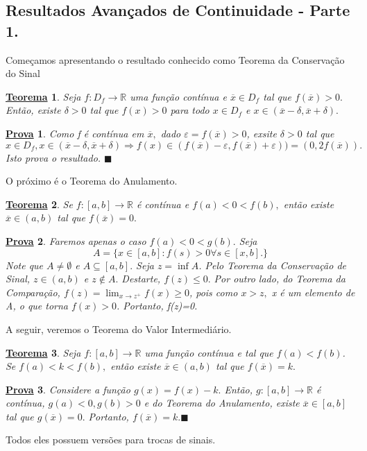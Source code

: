 \documentclass{article}
\newtheorem*{theorem*}{\underline{Teorema}}
\newtheorem*{proof*}{\underline{Prova}}
\renewcommand\qedsymbol{$\blacksquare$}
\begin{document}
\subsection{Resultados Avan\c cados de Continuidade - Parte 1.}
Come\c camos apresentando o resultado conhecido como Teorema da Conserva\c c\~ao do Sinal
 \begin{theorem*}
   Seja $f:D_{f}\rightarrow \mathbb{R}$ uma fun\c c\~ao cont\'inua e $\overline{x}\in D_{f}$ tal que $f(\overline{x})>0.$ 
   Ent\~ao, existe $\delta>0$ tal que $f(x)>0$ para todo $x\in D_{f}$ e $x\in(\overline{x}-\delta, \overline{x}+\delta).$
 \end{theorem*}
 \begin{proof*}
   Como f \'e cont\'inua em $\overline{x},$ dado $\varepsilon = f(\overline{x}) >0$, exsite $\delta > 0$ tal que 
     $$
       x\in D_{f}, x\in(\overline{x}-\delta, \overline{x}+\delta) \Rightarrow f(x)\in (f(\overline{x})-\varepsilon, f(\overline{x})+\varepsilon)) =
  (0, 2f(\overline{x})).
     $$
     Isto prova o resultado. \qedsymbol
 \end{proof*}
 O pr\'oximo \'e o Teorema do Anulamento.
 \begin{theorem*}
   Se $f:[a,b]\rightarrow \mathbb{R}$ \'e cont\'inua e $f(a)<0<f(b),$ ent\~ao existe $\overline{x}\in(a, b)$ tal que $f(\overline{x}) =0.$
 \end{theorem*}
\begin{proof*}
  Faremos apenas o caso $f(a)<0<g(b).$ Seja 
    $$
    A = \{x\in[a,b]:f(s)>0 \forall s\in[x, b].\}
    $$
    Note que $A\neq\emptyset$ e $A\subseteq{[a, b]}.$ Seja $z =\inf{A}$. Pelo Teorema da Conserva\c c\~ao de Sinal,
    $z\in(a, b)$ e $z\not\in A.$ Destarte, $f(z)\leq{0}.$ Por outro lado, do Teorema da Compara\c c\~ao, $f(z)=
    \lim_{x\to z^{+}}f(x)\geq{0}$, pois como $x > z,$ x \'e um elemento de A, o que torna $f(x)>0$. Portanto, f(z)=0.
\end{proof*}
 A seguir, veremos o Teorema do Valor Intermedi\'ario.
\begin{theorem*}
  Seja $f:[a, b]\rightarrow \mathbb{R}$ uma fun\c c\~ao cont\'inua e tal que  $f(a)<f(b)$. Se $f(a)<k<f(b),$
  ent\~ao existe $\overline{x}\in(a, b)$ tal que $f(\overline{x})=k.$
\end{theorem*}
\begin{proof*}
  Considere a fun\c c\~ao $g(x)=f(x)-k.$ Ent\~ao, $g:[a, b]\rightarrow \mathbb{R}$ \'e cont\'inua, $g(a)<0, g(b)>0$
  e do Teorema do Anulamento, existe $\overline{x}\in[a, b]$ tal que $g(\overline{x})=0.$ Portanto, $f(\overline{x})=k.$\qedsymbol
\end{proof*}
Todos eles possuem vers\~oes para trocas de sinais.
\newpage
\end{document}
